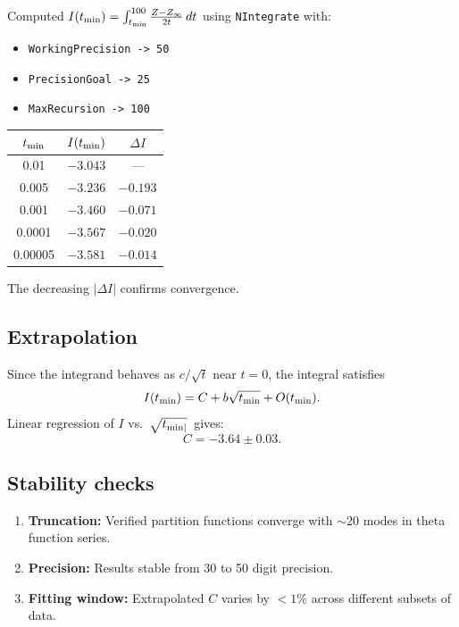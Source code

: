\documentclass[11pt]{article}
\begin{document}
Computed $I(t_{\rm min}) = \int_{t_{\rm min}}^{100} \frac{Z - Z_\infty}{2t}\, dt$ using \texttt{NIntegrate} with:
\begin{itemize}
\item \texttt{WorkingPrecision -> 50}
\item \texttt{PrecisionGoal -> 25}
\item \texttt{MaxRecursion -> 100}
\end{itemize}

\begin{center}
\begin{tabular}{|c|c|c|}
\hline
$t_{\rm min}$ & $I(t_{\rm min})$ & $\Delta I$ \\
\hline
0.01 & $-3.043$ & --- \\
0.005 & $-3.236$ & $-0.193$ \\
0.001 & $-3.460$ & $-0.071$ \\
0.0001 & $-3.567$ & $-0.020$ \\
0.00005 & $-3.581$ & $-0.014$ \\
\hline
\end{tabular}
\end{center}

The decreasing $|\Delta I|$ confirms convergence.

\subsection{Extrapolation}

Since the integrand behaves as $c/\sqrt{t}$ near $t = 0$, the integral satisfies
\begin{equation}
I(t_{\rm min}) = C + b\sqrt{t_{\rm min}} + O(t_{\rm min}).
\end{equation}
Linear regression of $I$ vs.\ $\sqrt{t_{\rm min|}}\,$ gives:
\begin{equation}
C = -3.64 \pm 0.03.
\end{equation}

\subsection{Stability checks}

\begin{enumerate}
\item \textbf{Truncation:} Verified partition functions converge with $\sim$20 modes in theta function series.
\item \textbf{Precision:} Results stable from 30 to 50 digit precision.
\item \textbf{Fitting window:} Extrapolated $C$ varies by $<1\%$ across different subsets of data.
\end{enumerate}
\end{document}
